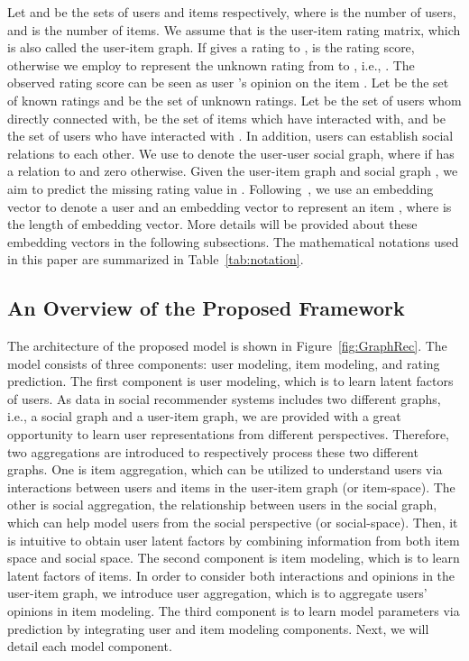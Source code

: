 \documentclass[sigconf]{acmart} \copyrightyear{2019}
\begin{document}
Let  and  be the sets of users and items respectively, where  is the number of users, and  is the number of items. We assume that  is the user-item rating matrix, which is also called the user-item graph. If  gives a rating to ,  is the rating score, otherwise we employ  to represent the unknown rating from  to , i.e., . The observed rating score   can be seen as user 's opinion on the item . Let  be the set of known ratings and  be the set of unknown ratings. Let  be the set of users whom  directly connected with,  be the set of items which  have interacted with, and  be the set of users who have interacted with .  In addition, users can establish social relations to each other. We use  to denote the user-user social graph, where  if  has a relation to  and zero otherwise. Given the user-item graph  and social graph , we aim to predict the missing rating value in . Following~\cite{He2017NCF}, we use an embedding vector  to denote a user  and an embedding vector  to represent an item , where  is the length of embedding vector. More details will be provided about these embedding vectors in the following subsections.  The mathematical notations used in this paper are summarized in Table~\ref{tab:notation}.






\subsection{An Overview of the Proposed Framework}

The architecture of the proposed model is shown in Figure~\ref{fig:GraphRec}. The model consists of three components: user modeling, item modeling, and rating prediction. The first component is user modeling, which is to learn latent factors of users. As data in social recommender systems includes two different graphs, i.e., a social graph and a user-item graph, we are provided with a great opportunity to learn user representations from different perspectives. Therefore, two aggregations are introduced to respectively process these two different graphs. One is item aggregation, which can be utilized to understand users via interactions between users and items in the user-item graph (or item-space). The other is social aggregation, the relationship between users in the social graph, which can help model users from the social perspective (or social-space). Then, it is intuitive to obtain user latent factors by combining information from both item space and social space. The second component is item modeling, which is to learn latent factors of items. In order to consider both interactions and opinions in the user-item graph, we introduce user aggregation, which is to aggregate users' opinions in item modeling. The third component is to learn model parameters via prediction by integrating user and item modeling components. Next, we will detail each model component.
\end{document}
